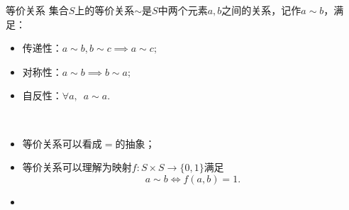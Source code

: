 \begin{definition}{等价关系}{}
	集合$S$上的等价关系$\sim$是$S$中两个元素$a,b$之间的关系，记作$a\sim b$，满足：
	\begin{itemize}
		\item 传递性：$a\sim b,b\sim c\implies a\sim c;$
		\item 对称性：$a\sim b\implies b\sim a;$
		\item 自反性：$\forall a,\enspace a\sim a.$
	\end{itemize}
\end{definition}
\begin{remark}~
	\begin{itemize}
		\item 等价关系可以看成$=$的抽象；
		\item 等价关系可以理解为映射$f:S\times S\to\{0,1\}$满足 
		\[
			a\sim b\iff f(a,b)=1.
		\]
		\item 
	\end{itemize}
\end{remark}


